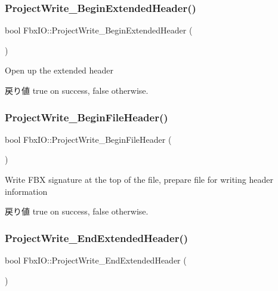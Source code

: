 \subsubsection{\texorpdfstring{Project\+Write\+\_\+\+Begin\+Extended\+Header()}{ProjectWrite\_BeginExtendedHeader()}}
{\footnotesize\ttfamily bool Fbx\+I\+O\+::\+Project\+Write\+\_\+\+Begin\+Extended\+Header (\begin{DoxyParamCaption}{ }\end{DoxyParamCaption})}

Open up the \textquotesingle{}extended header\textquotesingle{} \begin{DoxyReturn}{戻り値}
{\ttfamily true} on success, {\ttfamily false} otherwise. 
\end{DoxyReturn}
\mbox{\label{class_fbx_i_o_a95f114d4f159ca04056e8ab64f8f5ebe}} 
\subsubsection{\texorpdfstring{Project\+Write\+\_\+\+Begin\+File\+Header()}{ProjectWrite\_BeginFileHeader()}}
{\footnotesize\ttfamily bool Fbx\+I\+O\+::\+Project\+Write\+\_\+\+Begin\+File\+Header (\begin{DoxyParamCaption}{ }\end{DoxyParamCaption})}

Write F\+BX signature at the top of the file, prepare file for writing header information \begin{DoxyReturn}{戻り値}
{\ttfamily true} on success, {\ttfamily false} otherwise. 
\end{DoxyReturn}
\mbox{\label{class_fbx_i_o_a3ed18bfe65eb481801bd9e7a8f86b0c1}} 
\subsubsection{\texorpdfstring{Project\+Write\+\_\+\+End\+Extended\+Header()}{ProjectWrite\_EndExtendedHeader()}}
{\footnotesize\ttfamily bool Fbx\+I\+O\+::\+Project\+Write\+\_\+\+End\+Extended\+Header (\begin{DoxyParamCaption}{ }\end{DoxyParamCaption})}


